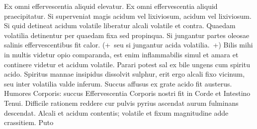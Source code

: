 \pend%
\pstart%
Ex omni effervescentia aliquid elevatur.
\pend
\pstart%
Ex omni effervescentia aliquid praecipitatur. Si superveniat magis acidum vel lixiviosum,
acidum vel lixiviosum.
\pend%
\pstart%
Si quid detineat acidum volatile liberatur alcali volatile et contra.
\pend%
\pstart%
Quaedam volatilia detinentur per quaedam fixa sed propinqua.
\pend%
\pstart%
Si jungantur partes oleosae salinis effervescentibus fit calor.
(+~seu si jungantur acida volatilia.~+)
\pend%
\pstart%
Bilis mihi in multis videtur opio comparanda, est enim inflammabilis simul et amara et continere videtur
et acidum volatile.%
%
%
\pend%
\pstart%
Parari potest sal ex bile ungens cum spiritu acido. Spiritus mannae insipidus dissolvit sulphur, erit ergo alcali fixo vicinum, seu inter volatilia valde inferum.
Succus 
affusus ex grate acido fit austerus. Humores Corporis:
succus
\pend%
\pstart%
Effervescentia Corporis nostri fit in Corde et Intestino Tenui.
\pend%
\pstart%
Difficile%
%
rationem reddere cur pulvis pyrius ascendat aurum fulminans descendat.
\pend%
\pstart%
Alcali et acidum
contentis; volatile et fixum magnitudine adde crassitiem.
\pend%
\newpage
\pstart%
Puto 
